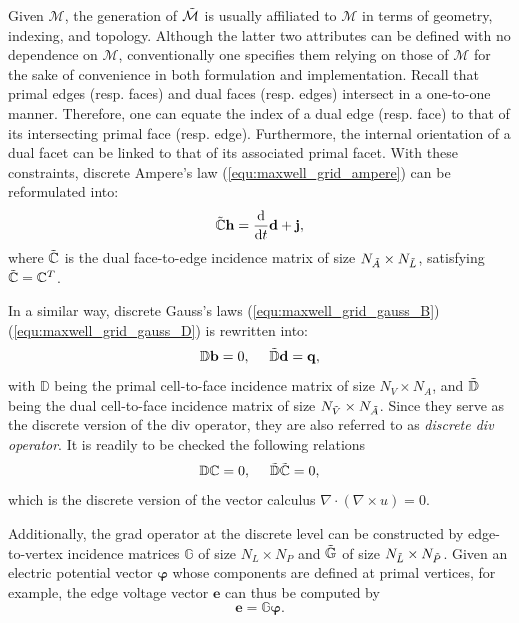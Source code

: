 \documentclass{article}
\begin{document}
Given $\mathcal{M}$, the generation of $\Tilde{\mathcal{M}}$ is usually affiliated to $\mathcal{M}$ in terms of geometry, indexing, and topology. Although the latter two attributes can be defined with no dependence on $\mathcal{M}$, conventionally one specifies them relying on those of $\mathcal{M}$ for the sake of convenience in both formulation and implementation. Recall that primal edges (resp. faces) and dual faces (resp. edges) intersect in a one-to-one manner. Therefore, one can equate the index of a dual edge (resp. face) to that of its intersecting primal face (resp. edge). Furthermore, the internal orientation of a dual facet can be linked to that of its associated primal facet. With these constraints, discrete Ampere's law (\ref{equ:maxwell_grid_ampere}) can be reformulated into:
\begin{equation*}
    \Tilde{\mathbb{C}}\mathbf{h} = \frac{\text{d}}{\text{d}t} \mathbf{d} + \mathbf{j},
\end{equation*}
where $\Tilde{\mathbb{C}}$ is the dual face-to-edge incidence matrix of size $N_{\Tilde{A}} \times N_{\Tilde{L}}$, satisfying $\Tilde{\mathbb{C}} = \mathbb{C}^T$. 

In a similar way, discrete Gauss's laws (\ref{equ:maxwell_grid_gauss_B})(\ref{equ:maxwell_grid_gauss_D}) is rewritten into:
\begin{equation*}
    \mathbb{D}\mathbf{b} = 0, \ \ \ \  \Tilde{\mathbb{D}}\mathbf{d} = \mathbf{q},
\end{equation*}
with $\mathbb{D}$ being the primal cell-to-face incidence matrix of size $N_{V} \times N_{A}$, and $\Tilde{\mathbb{D}}$ being the dual cell-to-face incidence matrix of size $N_{\Tilde{V}} \times N_{\Tilde{A}}$. Since they serve as the discrete version of the div operator, they are also referred to as \emph{discrete div operator}. It is readily to be checked the following relations 
\begin{equation*}
    \mathbb{D}\mathbb{C} = 0, \ \ \ \ \Tilde{\mathbb{D}}\Tilde{\mathbb{C}} = 0,
\end{equation*}
which is the discrete version of the vector calculus $\nabla \cdot (\nabla \times u) = 0$.

Additionally, the grad operator at the discrete level can be constructed by edge-to-vertex incidence matrices $\mathbb{G}$ of size $N_L \times N_P$ and $\Tilde{\mathbb{G}}$ of size $N_{\Tilde{L}} \times N_{\Tilde{P}}$. Given an electric potential vector $\bm{\varphi}$ whose components are defined at primal vertices, for example, the edge voltage vector $\mathbf{e}$ can thus be computed by
\begin{equation*}
    \mathbf{e} = \mathbb{G}\bm{\varphi}.
\end{equation*}
\end{document}

